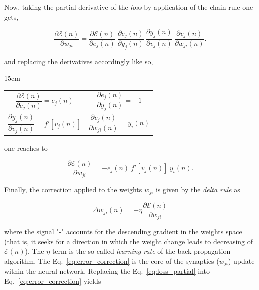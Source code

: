Now, taking the partial derivative of the \textit{loss} by application of the chain rule one gets,

\begin{equation}
\frac{\partial \mathcal{E}(n)}{\partial w_{ji}} = \frac{\partial \mathcal{E}(n)}{\partial e_{j}(n)} ~ \frac{\partial e_{j}(n)}{\partial y_{j}(n)} ~ \frac{\partial y_{j}(n)}{\partial v_{j}(n)} ~ \frac{\partial v_{j}(n)}{\partial w_{ji}(n)}.
\end{equation}

and replacing the derivatives accordingly like so,

\begin{table}[hbtp]{15cm}
\begin{tabular}{p{7cm}p{7cm}}
\begin{equation}
\frac{\partial \mathcal{E}(n)}{\partial e_{j}(n)} = e_{j}(n)
\end{equation}
&
\begin{equation}
\label{eq:signal_error_partial}
\frac{\partial e_{j}(n)}{\partial y_{j}(n)} = -1
\end{equation}
\\
\begin{equation}
\frac{\partial y_{j}(n)}{\partial v_{j}(n)} = \mathit{f}'[v_{j}(n)]
\end{equation}
&
\begin{equation}
\frac{\partial v_{j}(n)}{\partial w_{ji}(n)} = y_{i}(n)
\end{equation}
\end{tabular}
\end{table}

one reaches to

\begin{equation}
\label{eq:loss_partial}
\frac{\partial \mathcal{E}(n)}{\partial w_{ji}} = -e_{j}(n) ~ \mathit{f}'[v_{j}(n)] ~ y_{i}(n).
\end{equation}

Finally, the correction applied to the weights $w_{ji}$ is given by the \textit{delta rule} as

\begin{equation}
\label{eq:error_correction}
\Delta w_{ji}(n) = - \eta \frac{\partial \mathcal{E}(n)}{\partial w_{ji}}
\end{equation}

where the signal "-" accounts for the descending gradient in the weights space (that is, it seeks for a direction in which the weight change leads to decreasing of $\mathcal{E}(n)$). The $\eta$ term is the so called \textit{learning rate} of the back-propagation algorithm. The Eq.~\ref{eq:error_correction} is the core of the synaptics ($w_{ji}$) update within the neural network. Replacing the Eq.~\ref{eq:loss_partial} into Eq.~\ref{eq:error_correction} yields

